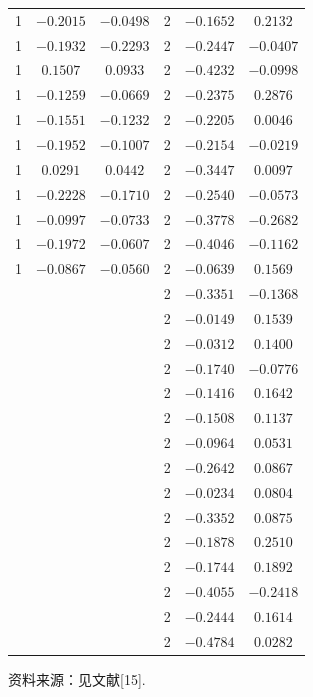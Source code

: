 \begin{mvtable}
\begin{longtable}{ccc|ccc}
1 & $-0.2015$ & $-0.0498$ & 2 & $-0.1652$ & $0.2132$\\
1 & $-0.1932$ & $-0.2293$ & 2 & $-0.2447$ & $-0.0407$\\
1 & $0.1507$ & $0.0933$ & 2 & $-0.4232$ & $-0.0998$\\
1 & $-0.1259$ & $-0.0669$ & 2 & $-0.2375$ & $0.2876$\\
1 & $-0.1551$ & $-0.1232$ & 2 & $-0.2205$ & $0.0046$\\
1 & $-0.1952$ & $-0.1007$ & 2 & $-0.2154$ & $-0.0219$\\
1 & $0.0291$ & $0.0442$ & 2 & $-0.3447$ & $0.0097$\\
1 & $-0.2228$ & $-0.1710$ & 2 & $-0.2540$ & $-0.0573$\\
1 & $-0.0997$ & $-0.0733$ & 2 & $-0.3778$ & $-0.2682$\\
1 & $-0.1972$ & $-0.0607$ & 2 & $-0.4046$ & $-0.1162$\\
1 & $-0.0867$ & $-0.0560$ & 2 & $-0.0639$ & $0.1569$\\
  &          &          & 2 & $-0.3351$ & $-0.1368$\\
  &          &          & 2 & $-0.0149$ & $0.1539$\\
  &          &          & 2 & $-0.0312$ & $0.1400$\\
  &          &          & 2 & $-0.1740$ & $-0.0776$\\
  &          &          & 2 & $-0.1416$ & $0.1642$\\
  &          &          & 2 & $-0.1508$ & $0.1137$\\
  &          &          & 2 & $-0.0964$ & $0.0531$\\
  &          &          & 2 & $-0.2642$ & $0.0867$\\
  &          &          & 2 & $-0.0234$ & $0.0804$\\
  &          &          & 2 & $-0.3352$ & $0.0875$\\
  &          &          & 2 & $-0.1878$ & $0.2510$\\
  &          &          & 2 & $-0.1744$ & $0.1892$\\
  &          &          & 2 & $-0.4055$ & $-0.2418$\\
  &          &          & 2 & $-0.2444$ & $0.1614$\\
  &          &          & 2 & $-0.4784$ & $0.0282$\\
\end{longtable}

\vspace{0.3em}
\noindent 资料来源：见文献[15].
\end{mvtable}
